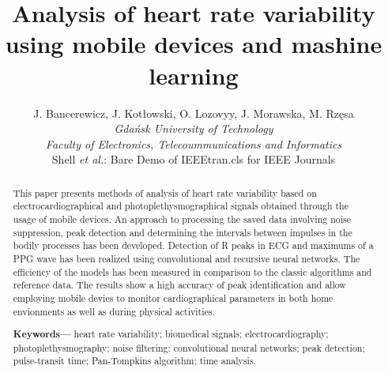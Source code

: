 \documentclass[journal]{IEEEtran}
\begin{document}
\title{Analysis of heart rate variability using mobile devices and mashine learning}
\author{
    J. Bancerewicz, J. Kotłowski, O. Lozovyy, J. Morawska, M. Rzęsa\\
    \textit{Gdańsk University of Technology}\\
    \textit{Faculty of Electronics, Telecoummunications and Informatics}



\markboth{}%
{Shell \MakeLowercase{\textit{et al.}}: Bare Demo of IEEEtran.cls for IEEE Journals}
\maketitle

\begin{abstract}
This paper presents methods of analysis of heart rate variability based on electrocardiographical and photoplethysmographical signals obtained through the usage of mobile devices. An approach to processing the saved data involving noise suppression, peak detection and determining the intervals between impulses in the bodily processes has been developed. Detection of R peaks in ECG and maximums of a PPG wave has been realized using convolutional and recursive neural networks. The efficiency of the models has been measured in comparison to the classic algorithms and reference data. The results show a high accuracy of peak identification and allow employing mobile devies to monitor cardiographical parameters in both home envionments as well as during physical activities.


\textbf{Keywords---} heart rate variability; biomedical signals; electrocardiography; photoplethysmography; noise filtering; convolutional neural networks; peak detection; pulse-transit time; Pan-Tompkins algorithm; time analysis.
\end{abstract}

}
\end{document}
